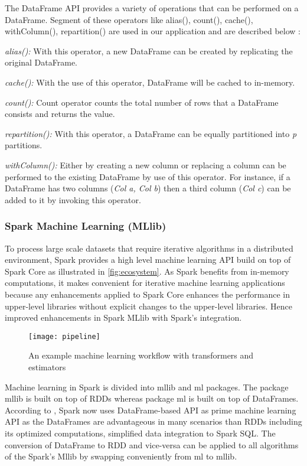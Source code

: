\par The DataFrame API provides a variety of operations that can be performed on a DataFrame. Segment of these operators like alias(), count(), cache(), withColumn(), repartition() are used in our application and are described below \cite{spark:website}:

\textit{alias():} With this operator, a new DataFrame can be created by replicating the original DataFrame.

\textit{cache():} With the use of this operator, DataFrame will be cached to in-memory.

\textit{count():} Count operator counts the total number of rows that a DataFrame consists and returns the value.

\textit{repartition():} With this operator, a DataFrame can be equally partitioned into \textit{p} partitions.

\textit{withColumn():} Either by creating a new column or replacing a column can be performed to the existing DataFrame by use of this operator. For instance, if a DataFrame has two columns (\textit{Col a, Col b}) then a third column (\textit{Col c}) can be added to it by invoking this operator.

\subsubsection{Spark Machine Learning (MLlib)}

\par To process large scale datasets that require iterative algorithms in a distributed environment, Spark provides a high level machine learning API build on top of Spark Core as illustrated in \ref{fig:ecosystem}. As Spark benefits from in-memory computations, it makes convenient for iterative machine learning applications because any enhancements applied to Spark Core enhances the performance in upper-level libraries without explicit changes to the upper-level libraries. Hence improved enhancements in Spark MLlib with Spark's integration.

\begin{figure}[htbp]
	\centering
		\texttt{[image: pipeline]}
	\caption{An example machine learning workflow with transformers and estimators}
	\label{fig: pipeline}
\end{figure}

\par Machine learning in Spark is divided into mllib and ml packages. The package mllib is built on top of RDDs whereas package ml is built on top of DataFrames. According to \cite{spark:website}, Spark now uses DataFrame-based API as prime machine learning API as the DataFrames are advantageous in many scenarios than RDDs including its optimized computations, simplified data integration to Spark SQL. The conversion of DataFrame to RDD and vice-versa can be applied to all algorithms of the Spark's Mllib by swapping conveniently from ml to mllib.


